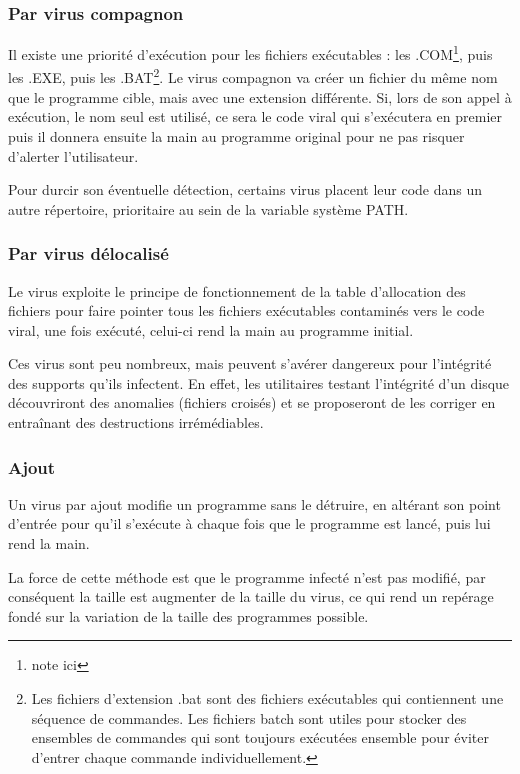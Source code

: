         \subsubsection{Par virus compagnon}
        Il existe une priorité d'exécution pour les fichiers exécutables : les .COM\footnote{note ici}, puis les .EXE, 
        puis les .BAT\footnote{Les fichiers d'extension .bat sont des fichiers exécutables qui contiennent une 
        séquence de commandes. Les fichiers batch sont utiles pour stocker des ensembles de commandes qui sont 
        toujours exécutées ensemble pour éviter d’entrer chaque commande individuellement.}.
        Le virus compagnon va créer un fichier du même nom que le programme cible, 
        mais avec une extension différente. Si, lors de son appel à exécution, le nom seul est utilisé, 
        ce sera le code viral qui s’exécutera en premier puis il donnera ensuite la main au programme 
        original pour ne pas risquer d’alerter l’utilisateur. %

        Pour durcir son éventuelle détection, certains virus placent leur code dans un autre répertoire, 
        prioritaire au sein de la variable système PATH. %

        \subsubsection{Par virus délocalisé}
        Le virus exploite le principe de fonctionnement de la table d'allocation des fichiers pour faire pointer 
        tous les fichiers exécutables contaminés vers le code viral, une fois exécuté, celui-ci rend 
        la main au programme initial. %

        Ces virus sont peu nombreux, mais peuvent s’avérer dangereux pour l’intégrité des supports qu’ils infectent. 
        En effet, les utilitaires testant l’intégrité d’un disque découvriront des anomalies (fichiers croisés) 
        et se proposeront de les corriger en entraînant des destructions irrémédiables. %

        \subsubsection{Ajout} \label{infeciton_ajout}
        Un virus par ajout modifie un programme sans le détruire, en altérant son point d’entrée pour 
        qu’il s'exécute à chaque fois que le programme est lancé, puis lui rend la main. %

        La force de cette méthode est que le programme infecté n’est pas modifié, par conséquent la taille 
        est augmenter de la taille du virus, ce qui rend un repérage fondé sur la variation de 
        la taille des programmes possible. %

